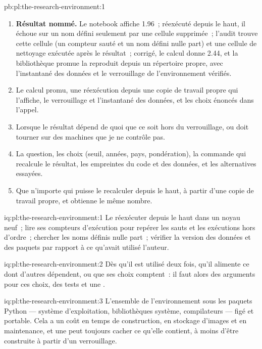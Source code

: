 \begin{solution}{pb:pl:the-research-environment:1}
\begin{enumerate}
\item \textbf{Résultat nommé.} Le notebook affiche 1.96~; réexécuté depuis le haut, il échoue sur un nom défini seulement par une cellule supprimée~; l'audit trouve cette
cellule (un compteur sauté et un nom défini nulle part) et une cellule de nettoyage exécutée après le résultat~; corrigé, le calcul donne 2.44, et la bibliothèque
promue la reproduit depuis un répertoire propre, avec l'instantané des données et le verrouillage de l'environnement vérifiés.
\item Le calcul promu, une réexécution depuis une copie de travail propre qui l'affiche, le verrouillage et l'instantané des données, et les choix énoncés dans
l'appel.
\item Lorsque le résultat dépend de quoi que ce soit hors du verrouillage, ou doit tourner sur des machines que je ne contrôle pas.
\item La question, les choix (seuil, années, pays, pondération), la commande qui recalcule le résultat, les empreintes du code et des données, et
les alternatives essayées.
\item Que n'importe qui puisse le recalculer depuis le haut, à partir d'une copie de travail propre, et obtienne le même nombre.
\end{enumerate}
\end{solution}

\begin{solution}{iq:pl:the-research-environment:1}
Le réexécuter depuis le haut dans un noyau neuf~; lire ses compteurs d'exécution pour repérer les sauts et les exécutions hors d'ordre~; chercher les noms définis nulle part~; vérifier la
version des données et des paquets par rapport à ce qu'avait utilisé l'auteur.
\end{solution}

\begin{solution}{iq:pl:the-research-environment:2}
Dès qu'il est utilisé deux fois, qu'il alimente ce dont d'autres dépendent, ou que ses choix comptent~: il faut alors des arguments pour ces choix, des tests et une .
\end{solution}

\begin{solution}{iq:pl:the-research-environment:3}
L'ensemble de l'environnement sous les paquets Python --- système d'exploitation, bibliothèques système, compilateurs --- figé et portable. Cela a un coût en temps de construction,
en stockage d'images et en maintenance, et une  peut toujours cacher ce qu'elle contient, à moins d'être construite à partir d'un verrouillage.
\end{solution}

